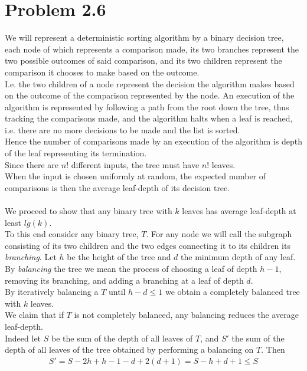 \documentclass[11pt]{article}
\begin{document}
\section*{Problem 2.6}
We will represent a deterministic sorting algorithm by a binary decision tree,
each node of which represents a comparison made,
its two branches represent the two possible outcomes of said comparison,
and its two children represent the comparison it chooses to make based on the outcome. \\
I.e. the two children of a node represent the decision the algorithm makes based on the outcome of the comparison represented by the node.
An execution of the algorithm is represented by following a path from the root down the tree,
thus tracking the comparisons made,
and the algorithm halts when a leaf is reached, 
i.e. there are no more decisions to be made and the list is sorted. \\
Hence the number of comparisons made by an execution of the algorithm is depth of the leaf representing its termination. \\
Since there are $n!$ different inputs, the tree must have $n!$ leaves. \\
When the input is chosen uniformly at random,
the expected number of comparisons is then the average leaf-depth of its decision tree. \\ \\
We proceed to show that any binary tree with $k$ leaves has average leaf-depth at least $lg(k)$. \\
To this end consider any binary tree, $T$. 
For any node we will call the subgraph consisting of its two children and the two edges connecting it to its children its \textit{branching}.
Let $h$ be the height of the tree and $d$ the minimum depth of any leaf. \\
By \textit{balancing} the tree we mean the process of choosing a leaf of depth $h-1$,
removing its branching,
and adding a branching at a leaf of depth $d$. \\
By iteratively balancing a $T$ until $h-d \leq 1$ we obtain a completely balanced tree with $k$ leaves. \\
We claim that if $T$ is not completely balanced, any balancing reduces the average leaf-depth. \\
Indeed let $S$ be the sum of the depth of all leaves of $T$,
and $S'$ the sum of the depth of all leaves of the tree obtained by performing a balancing on $T$. Then
\begin{align*}
	S'=S-2h+h-1-d+2(d+1)=S-h+d+1 \leq S
\end{align*}
\end{document}
